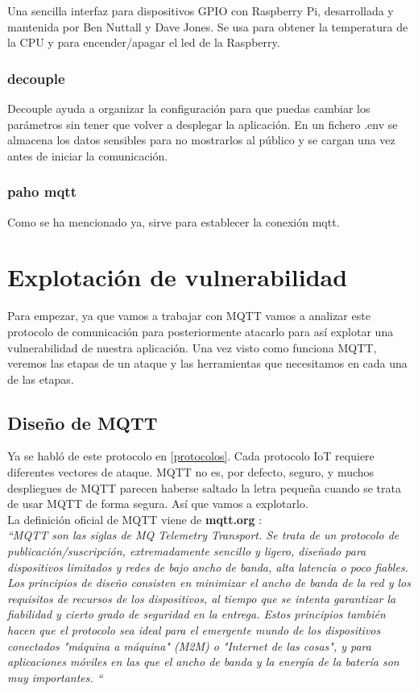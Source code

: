 {Una sencilla interfaz para dispositivos GPIO con Raspberry Pi, desarrollada y mantenida por Ben Nuttall y Dave Jones. Se usa para obtener la temperatura de la CPU y para encender/apagar el led de la Raspberry. \cite{gpiozero}

\subsubsection{decouple}

Decouple ayuda a organizar la configuración para que puedas cambiar los parámetros sin tener que volver a desplegar la aplicación. En un fichero .env se almacena los datos sensibles para no mostrarlos al público y se cargan una vez antes de iniciar la comunicación. \cite{decouple}

\subsubsection{paho mqtt}

Como se ha mencionado ya, sirve para establecer la conexión mqtt. \cite{paho-mqtt}

\newpage

\section{Explotación de vulnerabilidad}

Para empezar, ya que vamos a trabajar con MQTT vamos a analizar este protocolo de comunicación para posteriormente atacarlo para así explotar una vulnerabilidad de nuestra aplicación. Una vez visto como funciona MQTT, veremos las etapas de un ataque y las herramientas que necesitamos en cada una de las etapas.

\subsection{Diseño de MQTT}

Ya se habló de este protocolo en \ref{protocolos}. Cada protocolo IoT requiere diferentes vectores de ataque. MQTT no es, por defecto, seguro, y muchos despliegues de MQTT parecen haberse saltado la letra pequeña cuando se trata de usar MQTT de forma segura. Así que vamos a explotarlo. \\

La definición oficial de MQTT viene de \textbf{mqtt.org} \cite{mqtt}: \\

\textit{``MQTT son las siglas de MQ Telemetry Transport. Se trata de un protocolo de publicación/suscripción, extremadamente sencillo y ligero, diseñado para dispositivos limitados y redes de bajo ancho de banda, alta latencia o poco fiables. Los principios de diseño consisten en minimizar el ancho de banda de la red y los requisitos de recursos de los dispositivos, al tiempo que se intenta garantizar la fiabilidad y cierto grado de seguridad en la entrega. Estos principios también hacen que el protocolo sea ideal para el emergente mundo de los dispositivos conectados "máquina a máquina" (M2M) o "Internet de las cosas", y para aplicaciones móviles en las que el ancho de banda y la energía de la batería son muy importantes. ``} \\


}

